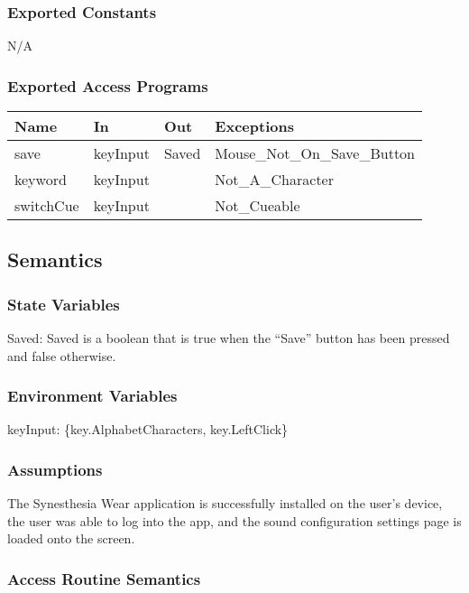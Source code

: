 \documentclass[12pt, titlepage]{article}
\begin{document}
\subsubsection{Exported Constants}
N/A

\subsubsection{Exported Access Programs}

\begin{center}
\begin{tabular}{p{4cm} p{4cm} p{4cm} p{4cm}}
\hline
\textbf{Name} & \textbf{In} & \textbf{Out} & \textbf{Exceptions} \\
\hline
save & keyInput & Saved & Mouse\_Not\_On\_Save\_Button\\
\hline
keyword & keyInput &  & Not\_A\_Character \\
\hline
switchCue & keyInput &  & Not\_Cueable \\
\hline
\end{tabular}
\end{center}

\subsection{Semantics}

\subsubsection{State Variables}

Saved: Saved is a boolean that is true when the ``Save'' button has been pressed and false otherwise.

\subsubsection{Environment Variables}

keyInput: \{key.AlphabetCharacters, key.LeftClick\}

\subsubsection{Assumptions}

The Synesthesia Wear application is successfully installed on the user's device, the user was able to log into the app, 
and the sound configuration settings page is loaded onto the screen.

\subsubsection{Access Routine Semantics}
\end{document}
